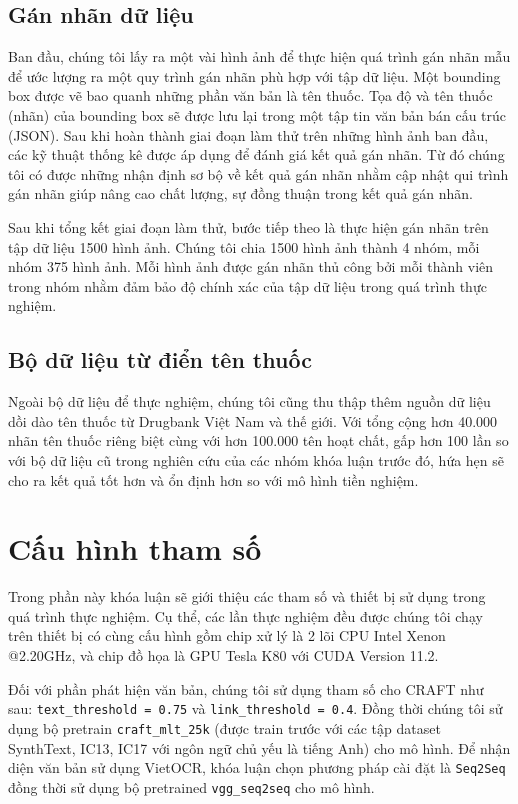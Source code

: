 \subsection{Gán nhãn dữ liệu}
Ban đầu, chúng tôi lấy ra một vài hình ảnh để thực hiện quá trình gán nhãn mẫu để ước
lượng ra một quy trình gán nhãn phù hợp với tập dữ liệu. Một bounding box được vẽ bao
quanh những phần văn bản là tên thuốc. Tọa độ và tên thuốc (nhãn) của bounding box sẽ
được lưu lại trong một tập tin văn bản bán cấu trúc (JSON). Sau khi hoàn thành giai đoạn
làm thử trên những hình ảnh ban đầu, các kỹ thuật thống kê được áp dụng để đánh giá kết
quả gán nhãn. Từ đó chúng tôi có được những nhận định sơ bộ về kết quả gán nhãn nhằm
cập nhật qui trình gán nhãn giúp nâng cao chất lượng, sự đồng thuận trong kết quả gán
nhãn.

Sau khi tổng kết giai đoạn làm thử, bước tiếp theo là thực hiện gán nhãn trên tập dữ liệu
1500 hình ảnh. Chúng tôi chia 1500 hình ảnh thành 4 nhóm, mỗi nhóm 375 hình ảnh. Mỗi
hình ảnh được gán nhãn thủ công bởi mỗi thành viên trong nhóm nhằm đảm bảo độ chính
xác của tập dữ liệu trong quá trình thực nghiệm.

\subsection{Bộ dữ liệu từ điển tên thuốc}
Ngoài bộ dữ liệu để thực nghiệm, chúng tôi cũng thu thập thêm nguồn dữ liệu dồi dào tên
thuốc từ Drugbank Việt Nam và thế giới. Với tổng cộng hơn 40.000 nhãn tên thuốc riêng biệt
cùng với hơn 100.000 tên hoạt chất, gấp hơn 100 lần so với bộ dữ liệu cũ trong nghiên cứu của các nhóm khóa luận trước đó,  hứa hẹn sẽ cho ra kết quả tốt hơn và ổn định hơn so với mô hình tiền
nghiệm.

\section{Cấu hình tham số}

Trong phần này khóa luận sẽ giới thiệu các tham số và thiết bị sử dụng trong quá trình thực nghiệm. Cụ thể, các lần thực nghiệm đều được chúng tôi chạy trên thiết bị có cùng cấu hình gồm chip xử lý là 2 lõi CPU Intel Xenon @2.20GHz, và chip đồ họa là GPU Tesla K80 với CUDA Version 11.2. 

Đối với phần phát hiện văn bản, chúng tôi sử dụng tham số cho CRAFT như sau: \verb|text_threshold = 0.75| và \verb|link_threshold = 0.4|. Đồng thời chúng tôi sử dụng bộ pretrain \verb|craft_mlt_25k| (được train trước với các tập dataset SynthText, IC13, IC17 với ngôn ngữ chủ yếu là tiếng Anh) cho mô hình. Để nhận diện văn bản sử dụng VietOCR, khóa luận chọn phương pháp cài đặt là \verb|Seq2Seq| đồng thời sử dụng bộ pretrained \verb|vgg_seq2seq| cho mô hình. 

